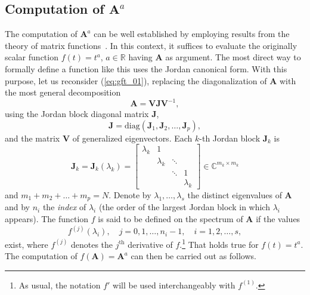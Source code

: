 \subsection{Computation of $\mathbf{A}^{{a}}$}\label{subsec:comp}
The computation of $\mathbf{A}^a$ can be well established by employing results from the theory of matrix functions~\cite{higham2008functions}. In this context, it suffices to evaluate the originally scalar function $f(t)=t^a$, $a\in\mathbb{R}$ having $\mathbf{A}$ as argument. The most direct way to formally define a function like this uses the Jordan canonical form. With this purpose, let us reconsider (\ref{eq:gft_01}), replacing the diagonalization of $\mathbf{A}$ with the most general decomposition
\begin{equation}
    \label{eq:Ajordan}
    \mathbf{A} = \mathbf{V} \mathbf{J} \mathbf{V}^{-1},
\end{equation}
using the Jordan block diagonal matrix $\mathbf{J}$,
\begin{equation}\label{eq:jcf}
    \mathbf{J}=\mathrm{diag}(\mathbf{J}_1,\mathbf{J}_2,\ldots,\mathbf{J}_p),
\end{equation}
and the matrix $\mathbf{V}$ of generalized eigenvectors. Each $k$-th Jordan block $\mathbf{J}_k$ is
\begin{equation}
    \mathbf{J}_k=\mathbf{J}_k(\lambda_k)=\left[\begin{array}{cccc}
            \lambda_k & 1         &        &           \\
                      & \lambda_k & \ddots &           \\
                      &           & \ddots & 1         \\
                      &           &        & \lambda_k
        \end{array}\right]\in\mathbb{C}^{m_k\times m_k}
\end{equation}
and $m_1+m_2+\ldots +m_p=N$. Denote by $\lambda_1,\ldots,\lambda_s$ the distinct eigenvalues of $\mathbf{A}$ and by $n_i$ the \emph{index} of $\lambda_i$ (the order of the largest Jordan block in which $\lambda_i$ appears). The function $f$ is said to be defined on the spectrum of $\mathbf{A}$ if the values
\begin{equation}\label{eq:defspec}
    f^{(j)}(\lambda_i),\quad j=0,1,\ldots,n_i-1,\quad i=1,2,\ldots,s,
\end{equation}
exist, where $f^{(j)}$ denotes the $j^{\textrm{th}}$ derivative of $f$.\footnote{As usual, the notation $f'$ will be used interchangeably with $f^{(1)}$.} That holds true for $f(t)=t^a$. The computation of $f(\mathbf{A})=\mathbf{A}^a$ can then be carried out as follows.
